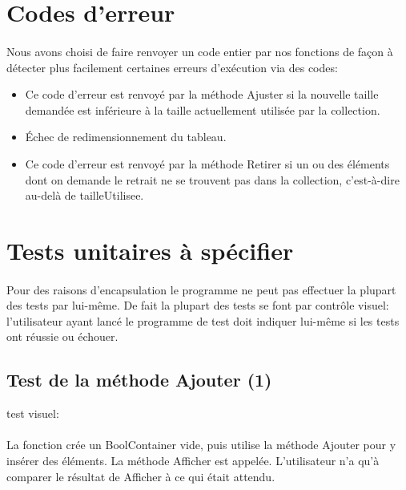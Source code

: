 \documentclass[a4paper, 12pts]{article}
\begin{document}
\section{Codes d'erreur}
\paragraph{}
Nous avons choisi de faire renvoyer un code entier par nos fonctions de façon à détecter plus facilement certaines erreurs d’exécution via des codes:
\begin{itemize}
	\item 
Ce code d’erreur est renvoyé par la méthode Ajuster si la nouvelle taille demandée est inférieure à la taille actuellement utilisée par la collection.
	\item 
Échec de redimensionnement du tableau.
	\item 
Ce code d’erreur est renvoyé par la méthode Retirer si un ou des éléments dont on demande le retrait ne se trouvent pas dans la collection, c’est-à-dire au-delà de tailleUtilisee.
\end{itemize}


\section{Tests unitaires à spécifier}

\paragraph{}
Pour des raisons d'encapsulation le programme ne peut pas effectuer la plupart des tests par lui-même. De fait la plupart des tests se font par contrôle visuel: l'utilisateur ayant lancé le programme de test doit indiquer lui-même si les tests ont réussie ou échouer.

\subsection{Test de la méthode Ajouter (1)}
test visuel:
\paragraph{}
La fonction crée un BoolContainer vide, puis utilise la méthode Ajouter pour y insérer des éléments. La méthode Afficher est appelée. L’utilisateur n’a qu’à comparer le résultat de Afficher à ce qui était attendu.
\end{document}
